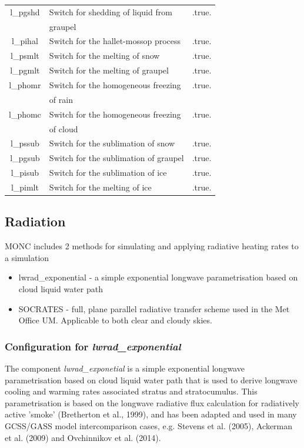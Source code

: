 \documentclass[a4paper,11pt]{article}
\begin{document}
\begin{table}[H]
\begin{tabular}{|c|l|c|}
\hline
  l\_pgshd & Switch for shedding of liquid from & .true. \tabularnewline
    & graupel & \tabularnewline
\hline
  l\_pihal & Switch for the hallet-mossop process & .true. \tabularnewline
\hline
  l\_psmlt & Switch for the melting of snow  & .true. \tabularnewline
\hline
  l\_pgmlt & Switch for the melting of graupel & .true. \tabularnewline
\hline
  l\_phomr & Switch for the homogeneous freezing & .true. \tabularnewline
    & of rain & \tabularnewline
  l\_phomc & Switch for the homogeneous freezing & .true. \tabularnewline
    & of cloud & \tabularnewline
\hline
  l\_pssub & Switch for the sublimation of snow & .true. \tabularnewline
\hline
  l\_pgsub & Switch for the sublimation of graupel & .true. \tabularnewline
\hline
  l\_pisub & Switch for the sublimation of ice & .true. \tabularnewline
\hline
  l\_pimlt & Switch for the melting of ice & .true. \tabularnewline
\hline
\hline
\end{tabular}
\end{table}

\subsection{Radiation}

MONC includes 2 methods for simulating and applying radiative heating rates to
a simulation
\begin{itemize}
  \item {lwrad\_exponential - a simple exponential longwave parametrisation based on cloud liquid water
  path}
  \item {SOCRATES - full, plane parallel radiative transfer scheme used in the Met Office
  UM. Applicable to both clear and cloudy skies.}
\end{itemize}

\subsubsection{Configuration for \emph{lwrad\_exponential}}

The component \emph{lwrad\_exponetial} is a simple exponential longwave
parametrisation based on cloud liquid water
path that is used to derive longwave cooling and warming rates associated
stratus and stratocumulus. This parametrisation is based on the longwave radiative
flux calculation for radiatively active 'smoke' (Bretherton et al., 1999), and has
been adapted and used in many GCSS/GASS model intercomparison cases, e.g. Stevens
et al. (2005), Ackerman et al. (2009) and Ovchinnikov et al. (2014).
\end{document}
